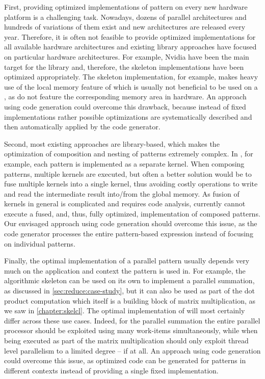 First, providing optimized implementations of pattern on every new hardware platform is a challenging task.
Nowadays, dozens of parallel architectures and hundreds of variations of them exist and new architectures are released every year.
Therefore, it is often not feasible to provide optimized implementations for all available hardware architectures and existing library approaches have focused on particular hardware architectures.
For example, Nvidia \GPUs have been the main target for the \SkelCL library and, therefore, the skeleton implementations have been optimized appropriately.
The \stencil skeleton implementation, for example, makes heavy use of the local memory feature of \OpenCL which is usually not beneficial to be used on a \CPU, as \CPUs do not feature the corresponding memory area in hardware.
An approach using code generation could overcome this drawback, because instead of fixed implementations rather possible optimizations are systematically described and then automatically applied by the code generator.

Second, most existing approaches are library-based, which makes the optimization of composition and nesting of patterns extremely complex.
In \SkelCL, for example, each pattern is implemented as a separate \OpenCL kernel.
When composing patterns, multiple \OpenCL kernels are executed, but often a better solution would be to fuse multiple \OpenCL kernels into a single \OpenCL kernel, thus avoiding costly operations to write and read the intermediate result into/from the global memory.
As fusion of \OpenCL kernels in general is complicated and requires code analysis, \SkelCL currently cannot execute a fused, and, thus, fully optimized, implementation of composed patterns.
Our envisaged approach using code generation should overcome this issue, as the code generator processes the entire pattern-based expression instead of focusing on individual patterns.

Finally, the optimal implementation of a parallel pattern usually depends very much on the application and context the pattern is used in.
For example, the algorithmic skeleton \reduce can be used on its own to implement a parallel summation, as discussed in \autoref{sec:reduce:case-study}, but it can also be used as part of the dot product computation which itself is a building block of matrix multiplication, as we saw in \autoref{chapter:skelcl}.
The optimal implementation of \reduce will most certainly differ across these use cases.
Indeed, for the parallel summation the entire parallel processor should be exploited using many \OpenCL work-items simultaneously, while when being executed as part of the matrix multiplication \reduce should only exploit thread level parallelism to a limited degree -- if at all.
An approach using code generation could overcome this issue, as optimized code can be generated for patterns in different contexts instead of providing a single fixed implementation.

